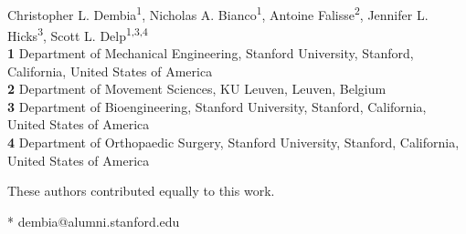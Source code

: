 \documentclass[10pt,letterpaper]{article}
\begin{document}
\vspace*{0.2in}

\begin{flushleft}
{\Large
\textbf{} %
}
\newline
\\
Christopher L. Dembia\textsuperscript{1\Yinyang*},
Nicholas A. Bianco\textsuperscript{1\Yinyang},
Antoine Falisse\textsuperscript{2},
Jennifer L. Hicks\textsuperscript{3},
Scott L. Delp\textsuperscript{1,3,4}
\\
\bigskip
\textbf{1} Department of Mechanical Engineering, Stanford University, Stanford, California, United States of America
\\
\textbf{2} Department of Movement Sciences, KU Leuven, Leuven, Belgium
\\
\textbf{3} Department of Bioengineering, Stanford University, Stanford, California, United States of America
\\
\textbf{4} Department of Orthopaedic Surgery, Stanford University, Stanford, California, United States of America
\\
\bigskip

%
%
\Yinyang These authors contributed equally to this work.





* dembia@alumni.stanford.edu

\end{flushleft}
\end{document}
